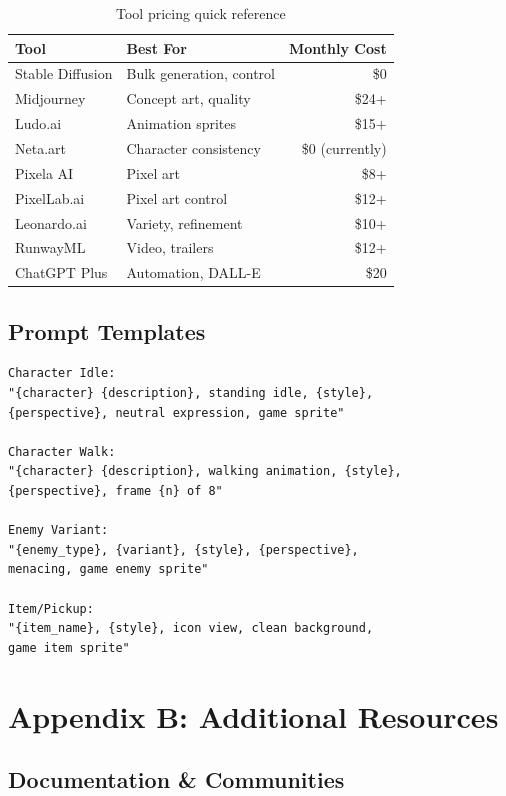 \documentclass[11pt]{article}
\begin{document}
\begin{table}[H]
\centering
\begin{tabular}{llr}
\toprule
\textbf{Tool} & \textbf{Best For} & \textbf{Monthly Cost} \\
\midrule
Stable Diffusion & Bulk generation, control & \$0 \\
Midjourney & Concept art, quality & \$24+ \\
Ludo.ai & Animation sprites & \$15+ \\
Neta.art & Character consistency & \$0 (currently) \\
Pixela AI & Pixel art & \$8+ \\
PixelLab.ai & Pixel art control & \$12+ \\
Leonardo.ai & Variety, refinement & \$10+ \\
RunwayML & Video, trailers & \$12+ \\
ChatGPT Plus & Automation, DALL-E & \$20 \\
\bottomrule
\end{tabular}
\caption{Tool pricing quick reference}
\end{table}

\subsection{Prompt Templates}

\begin{verbatim}
Character Idle:
"{character} {description}, standing idle, {style},
{perspective}, neutral expression, game sprite"

Character Walk:
"{character} {description}, walking animation, {style},
{perspective}, frame {n} of 8"

Enemy Variant:
"{enemy_type}, {variant}, {style}, {perspective},
menacing, game enemy sprite"

Item/Pickup:
"{item_name}, {style}, icon view, clean background,
game item sprite"
\end{verbatim}

\section{Appendix B: Additional Resources}

\subsection{Documentation \& Communities}
\end{document}
